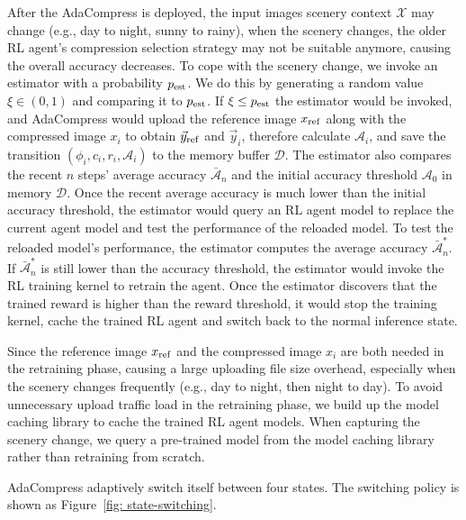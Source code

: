 After the AdaCompress is deployed, the input images scenery context $ \mathcal{X} $ may change (e.g., day to night, sunny to rainy), when the scenery changes, the older RL agent's compression selection strategy may not be suitable anymore, causing the overall accuracy decreases. To cope with the scenery change, we invoke an estimator with a probability $ p_{\rm est} $. We do this by generating a random value $ \xi \in (0,1) $ and comparing it to $ p_{\rm est} $. If $ \xi \leq p_{\rm est} $ the estimator would be invoked, and AdaCompress would upload the reference image $ x_{\rm ref} $ along with the compressed image $ x_i $ to obtain $ \vec{y}_{\rm ref} $ and $ \vec{y}_i $, therefore calculate $ \mathcal{A}_i $, and save the transition $ (\phi_i, c_i, r_i, \mathcal{A}_i) $ to the memory buffer $ \mathcal{D} $. The estimator also compares the recent $ n $ steps' average accuracy $ \bar{\mathcal{A}}_n $ and the initial accuracy threshold $ \mathcal{A}_0 $ in memory $ \mathcal{D} $. Once the recent average accuracy is much lower than the initial accuracy threshold, the estimator would query an RL agent model to replace the current agent model and test the performance of the reloaded model. To test the reloaded model's performance, the estimator computes the average accuracy $ \bar{\mathcal{A}}^*_n $. If $ \bar{\mathcal{A}}^*_n $ is still lower than the accuracy threshold, the estimator would invoke the RL training kernel to retrain the agent. Once the estimator discovers that the trained reward is higher than the reward threshold, it would stop the training kernel, cache the trained RL agent and switch back to the normal inference state. 

Since the reference image $ x_{\rm ref} $ and the compressed image $ x_i $ are both needed in the retraining phase, causing a large uploading file size overhead, especially when the scenery changes frequently (e.g., day to night, then night to day). To avoid unnecessary upload traffic load in the retraining phase, we build up the model caching library to cache the trained RL agent models. When capturing the scenery change, we query a pre-trained model from the model caching library rather than retraining from scratch. %

AdaCompress adaptively switch itself between four states. The switching policy is shown as Figure~\ref{fig: state-switching}.


